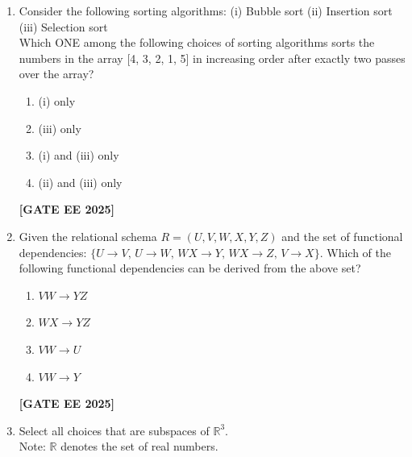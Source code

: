 \documentclass[journal]{IEEEtran}
\newcommand{\qfooter}{%
  \begin{flushright}\footnotesize\textbf{[GATE EE 2025]}\end{flushright}\vspace{1em}%
}
\begin{document}
\begin{enumerate}[leftmargin=*,label=\arabic*.]
\item Consider the following sorting algorithms:
(i) Bubble sort
(ii) Insertion sort
(iii) Selection sort\\
Which ONE among the following choices of sorting algorithms sorts the numbers in the array [4, 3, 2, 1, 5] in increasing order after exactly two passes over the array?
\begin{multicols}{2}
\begin{enumerate}[label=(\Alph*)]
\item (i) only
\item (iii) only
\item (i) and (iii) only
\item (ii) and (iii) only
\end{enumerate} \qfooter
\end{multicols}

\item Given the relational schema $R = (U,V,W,X,Y,Z)$ and the set of functional dependencies: $\{U \to V,\, U \to W,\, WX \to Y,\, WX \to Z,\, V \to X\}$. Which of the following functional dependencies can be derived from the above set?
\begin{multicols}{2}
\begin{enumerate}[label=(\Alph*)]
\item $VW \to YZ$
\item $WX \to YZ$
\item $VW \to U$
\item $VW \to Y$
\end{enumerate} \qfooter
\end{multicols}

\item Select all choices that are subspaces of $\mathbb{R}^3$.\\
Note: $\mathbb{R}$ denotes the set of real numbers.


\end{enumerate}
\end{document}

